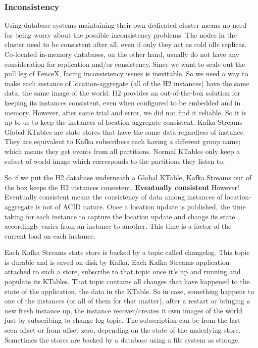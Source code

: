 \documentclass[a4]{report}
\begin{document}
    \subsubsection{Inconsistency}
    Using database systems maintaining their own dedicated cluster means no need for being worry about the
    possible inconsistency problems.
    The nodes in the cluster need to be consistent after all, even if only they act as cold idle replicas.
    Co-located in-memory databases, on the other hand, usually do not have any consideration for replication and/or consistency.
    Since we want to scale out the pull leg of FenceX, facing inconsistency issues is inevitable.
    So we need a way to make each instance of location-aggregate (all of the H2 instances) have the same data, the same image of the world.
    H2 provides an out-of-the-box solution for keeping its instances consistent, even when configured to be embedded
    and in memory.
    However, after some trial and error, we did not find it reliable.
    So it is up to us to keep the instances of location-aggregate consistent.
    Kafka Streams Global KTables are state stores that have the same data regardless of instance.
    They are equivalent to Kafka subscribers each having a different group name;
    which means they get events from all partitions.
    Normal KTables only keep a subset of world image which corresponds to the partitions they listen to.

    So if we put the H2 database underneath a Global KTable, Kafka Streams out of the box keeps the H2 instances consistent.
    \textbf{Eventually consistent} However!
    Eventually consistent means the consistency of data among instances of location-aggregate is not of ACID nature.
    Once a location update is published, the time taking for each instance to capture the location update and change its state accordingly varies from an instance to another.
    This time is a factor of the current load on each instance.

    Each Kafka Streams state store is backed by a topic called changelog.
    This topic is durable and is saved on disk by Kafka.
    Each Kafka Streams application attached to such a store, subscribe to that topic once it's up and running and populate its KTables.
    That topic contains all changes that have happened to the state of the application, the data in the KTable.
    So in case, something happens to one of the instances (or all of them for that matter), after a restart or bringing a new fresh instance up, the instance recover/creates it own images of the world just by subscribing to change log topic.
    The subscription can be from the last seen offset or from offset zero, depending on the state of the underlying store.
    Sometimes the stores are backed by a database using a file system as storage.
\end{document}
